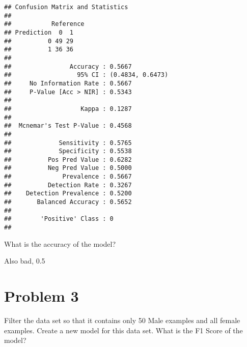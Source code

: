\documentclass[
]{article}
\newenvironment{Shaded}{\begin{snugshade}}{\end{snugshade}}
\newcommand{\DataTypeTok}[1]{\textcolor[rgb]{0.13,0.29,0.53}{#1}}
\newcommand{\DecValTok}[1]{\textcolor[rgb]{0.00,0.00,0.81}{#1}}
\newcommand{\FloatTok}[1]{\textcolor[rgb]{0.00,0.00,0.81}{#1}}
\newcommand{\KeywordTok}[1]{\textcolor[rgb]{0.13,0.29,0.53}{\textbf{#1}}}
\newcommand{\NormalTok}[1]{#1}
\newcommand{\OperatorTok}[1]{\textcolor[rgb]{0.81,0.36,0.00}{\textbf{#1}}}
\newcommand{\StringTok}[1]{\textcolor[rgb]{0.31,0.60,0.02}{#1}}
\begin{document}
\begin{Shaded}
\end{Shaded}

\begin{verbatim}
## Confusion Matrix and Statistics
## 
##           Reference
## Prediction  0  1
##          0 49 29
##          1 36 36
##                                           
##                Accuracy : 0.5667          
##                  95% CI : (0.4834, 0.6473)
##     No Information Rate : 0.5667          
##     P-Value [Acc > NIR] : 0.5343          
##                                           
##                   Kappa : 0.1287          
##                                           
##  Mcnemar's Test P-Value : 0.4568          
##                                           
##             Sensitivity : 0.5765          
##             Specificity : 0.5538          
##          Pos Pred Value : 0.6282          
##          Neg Pred Value : 0.5000          
##              Prevalence : 0.5667          
##          Detection Rate : 0.3267          
##    Detection Prevalence : 0.5200          
##       Balanced Accuracy : 0.5652          
##                                           
##        'Positive' Class : 0               
## 
\end{verbatim}

What is the accuracy of the model?

Also bad, 0.5

\hypertarget{problem-3}{%
\section{Problem 3}\label{problem-3}}

Filter the data set so that it contains only 50 Male examples and all
female examples. Create a new model for this data set. What is the F1
Score of the model?
\end{document}
